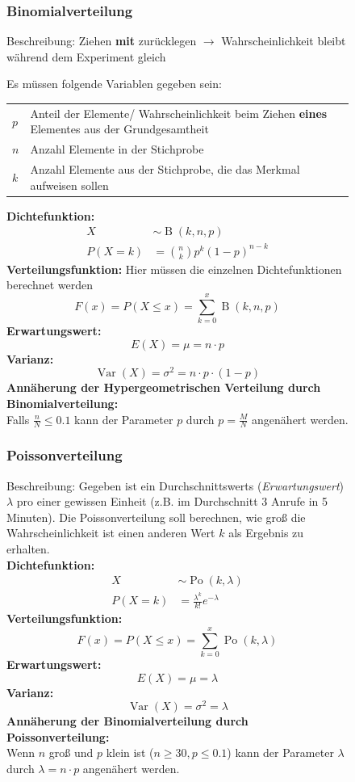 \documentclass[12pt, a4paper]{scrreprt}
\begin{document}
\begin{figure}[H]
  \subsubsection{Binomialverteilung}
Beschreibung: Ziehen \textbf{mit} zurücklegen $\rightarrow$ Wahrscheinlichkeit bleibt während dem Experiment gleich

  Es müssen folgende Variablen gegeben sein:

  \begin{tabularx}{\textwidth}{lX}
    \toprule
    \(p\) & Anteil der Elemente/ Wahrscheinlichkeit beim Ziehen \textbf{eines} Elementes aus der Grundgesamtheit\\
    \(n\) & Anzahl Elemente in der Stichprobe\\
    \(k\) & Anzahl Elemente aus der Stichprobe, die das Merkmal aufweisen sollen\\
    \bottomrule
  \end{tabularx}

  \textbf{Dichtefunktion:}
  \begin{align*}
    X &\sim \operatorname{B}(k,n,p)\\[1em]
    P(X = k) &= \binom{n}{k}p^k{(1 - p)}^{n-k}
  \end{align*}
  \textbf{Verteilungsfunktion:}
  Hier müssen die einzelnen Dichtefunktionen berechnet werden
  \[F(x) = P(X \leq x) = \sum_{k=0}^x\operatorname{B}(k,n,p)\]
  \textbf{Erwartungswert:}
  \[E(X) = \mu = n \cdot p\]
  \textbf{Varianz:}
  \[\operatorname{Var}(X) = \sigma^2 = n \cdot p \cdot (1 - p)\]
  \textbf{Annäherung der Hypergeometrischen Verteilung durch Binomialverteilung:}\\
  Falls \(\frac{n}{N} \leq 0.1\) kann der Parameter \(p\) durch \(p = \frac{M}{N}\) angenähert werden.
\end{figure}

\begin{figure}[H]
  \subsubsection{Poissonverteilung}
  Beschreibung: Gegeben ist ein Durchschnittswerts (\textit{Erwartungswert}) \(\lambda\) pro einer gewissen Einheit (z.B. im Durchschnitt 3 Anrufe in 5 Minuten). Die Poissonverteilung soll berechnen, wie groß die Wahrscheinlichkeit ist einen anderen Wert \(k\) als Ergebnis zu erhalten.\\
  \textbf{Dichtefunktion:}
  \begin{align*}
    X & \sim \operatorname{Po}(k, \lambda)\\[1em]
    P(X = k) & = \frac{\lambda^k}{k!}e^{-\lambda}
  \end{align*}
  \textbf{Verteilungsfunktion:}
  \[F(x) = P(X \leq x) = \sum_{k=0}^x\operatorname{Po}(k,\lambda)\]
  \textbf{Erwartungswert:}
  \[E(X) = \mu = \lambda\]
  \textbf{Varianz:}
  \[\operatorname{Var}(X) = \sigma^2 = \lambda\]
  \textbf{Annäherung der Binomialverteilung durch Poissonverteilung:}\\
  Wenn \(n\) groß und \(p\) klein ist (\(n \geq 30, p \leq 0.1\)) kann der Parameter \(\lambda\) durch \(\lambda = n \cdot p\) angenähert werden.
\end{figure}
\end{document}
